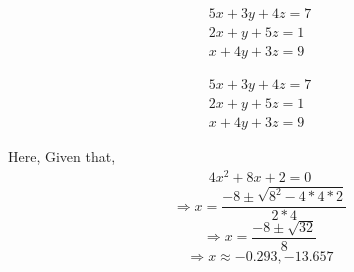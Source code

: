 \documentclass[11pt]{article}
\begin{document}
\begin{eqnarray*}
5x + 3y + 4z = 7\\
2x + y + 5z = 1\\
x + 4y + 3z = 9
\end{eqnarray*}

\begin{eqnarray}
5x + 3y + 4z = 7\\
2x + y + 5z = 1\\
x + 4y + 3z = 9
\end{eqnarray}

Here, Given that,
\begin{eqnarray}
4x^2 + 8x + 2 = 0
\end{eqnarray}
$$\Rightarrow x = \displaystyle{\frac{-8 \pm \sqrt{8^2 - 4 * 4 * 2}}{2 * 4}}$$
$$\Rightarrow x = \displaystyle{\frac{-8 \pm \sqrt{32}}{8}}$$
$$\Rightarrow x \approx -0.293, -13.657$$
\end{document}
